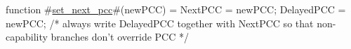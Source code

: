 function #\hyperref[zsetzynextzypcc]{set\_next\_pcc}#(newPCC) = {
  NextPCC    = newPCC;
  DelayedPCC = newPCC; /* always write DelayedPCC together with NextPCC so 
                          that non-capability branches don't override PCC */
}
